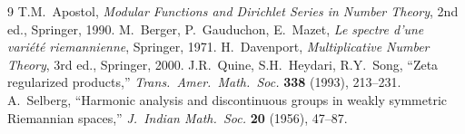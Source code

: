 \documentclass[11pt,a4paper]{article}
\begin{document}
\begin{thebibliography}{9}
 T.M.\ Apostol, \emph{Modular Functions and Dirichlet Series
  in Number Theory}, 2nd ed., Springer, 1990.
 M.\ Berger, P.\ Gauduchon, E.\ Mazet, \emph{Le spectre d'une
  vari\'et\'e riemannienne}, Springer, 1971.
 H.\ Davenport, \emph{Multiplicative Number Theory},
  3rd ed., Springer, 2000.
 J.R.\ Quine, S.H.\ Heydari, R.Y.\ Song, ``Zeta regularized
  products,'' \emph{Trans.\ Amer.\ Math.\ Soc.} \textbf{338} (1993), 213--231.
 A.\ Selberg, ``Harmonic analysis and discontinuous groups in
  weakly symmetric Riemannian spaces,'' \emph{J.\ Indian Math.\ Soc.} \textbf{20}
  (1956), 47--87.
\end{thebibliography}
\end{document}
